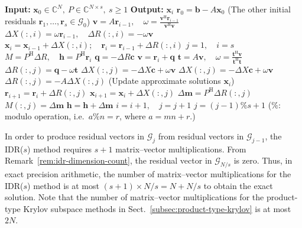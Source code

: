 \begin{algorithm}[H]\caption{{The IDR($s$) method}}\label{alg:idr}\begin{algorithmic}[1]
\Statex\textbf{Input:} $\bm x_0\in\mathbb C^N,\ P\in\mathbb C^{N\times s},\ s\ge1$
\Statex\textbf{Output:} $\bm x_i$
\State $\bm r_0=\bm b-A\bm x_0$
\Statex ({The other initial residuals $\bm r_1,\ldots,\bm r_s\in\mathcal G_0$})
\State $\bm v=A\bm r_{i-1},\quad\omega=\frac{\bm v^{\mathrm H}\bm r_{i-1}}{\bm v^{\mathrm H}\bm v}$
\State $\Delta X(:,i)=\omega\bm r_{i-1},\quad\Delta R(:,i)=-\omega\bm v$
\State $\bm x_i=\bm x_{i-1}+\Delta X(:,i);\quad\bm r_i=\bm r_{i-1}+\Delta R(:,i)$
\EndFor
\State $j=1,\quad i=s$
\State $M=P^{\mathrm H}\Delta R,\quad\bm h=P^{\mathrm H}\bm r_i$
\State $\bm q=-\Delta R\bm c$
\State $\bm v=\bm r_i+\bm q$
\State $\bm t=A\bm v,\quad\omega=\frac{\bm t^{\mathrm H}\bm v}{\bm t^{\mathrm H}\bm t}$
\State $\Delta R(:,j)=\bm q-\omega\bm t$
\State $\Delta X(:,j)=-\Delta X\bm c+\omega\bm v$
\Else
\State $\Delta X(:,j)=-\Delta X\bm c+\omega\bm v$
\State $\Delta R(:,j)=-A\Delta X(:,j)$
\EndIf
\Statex ({Update approximate solutions $\bm x_i$})
\State $\bm r_{i+1}=\bm r_i+\Delta R(:,j)$
\State $\bm x_{i+1}=\bm x_i+\Delta X(:,j)$
\State $\Delta\bm m=P^{\mathrm H}\Delta R(:,j)$
\State $M(:,j)=\Delta\bm m$
\State $\bm h=\bm h+\Delta\bm m$
\State $i=i+1,\quad j=j+1$
\State $j=(j-1)\%s+1$ ({$\%$: modulo operation, i.e.\ $a\%n=r$, where $a=mn+r$.})
\EndFor\EndWhile\end{algorithmic}\end{algorithm}
\par{}
\begin{Remark}\label{rem:idr-matvec-bound}
{In order to produce residual vectors in $\mathcal G_j$ from residual vectors in $\mathcal G_{j-1}$, the IDR($s$) method requires $s+1$ matrix--vector multiplications. From Remark\ \ref{rem:idr-dimension-count}, the residual vector in $\mathcal G_{N/s}$ is zero. Thus, in exact precision arithmetic, the number of matrix--vector multiplications for the IDR($s$) method is at most $(s+1)\times N/s=N+N/s$ to obtain the exact solution. Note that the number of matrix--vector multiplications for the product-type Krylov subspace methods in Sect.\ \ref{subsec:product-type-krylov} is at most $2N$.}
\end{Remark}
